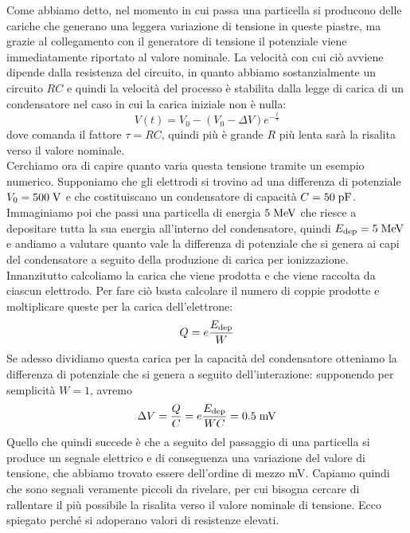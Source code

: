 \begin{esempio}
   Come abbiamo detto, nel momento in cui passa una particella si producono delle cariche che generano una leggera variazione di tensione in queste piastre, ma grazie al collegamento con il generatore di tensione il potenziale viene immediatamente riportato al valore nominale. La velocità con cui ciò avviene dipende dalla resistenza del circuito, in quanto abbiamo sostanzialmente un circuito $RC$ e quindi la velocità del processo è stabilita dalla legge di carica di un condensatore nel caso in cui la carica iniziale non è nulla:
   \begin{equation*}
      V(t)=V_0 - (V_0 - \Delta V) e^{-\frac{t}{\tau}}
   \end{equation*}
   dove comanda il fattore $\tau=RC$, quindi più è grande $R$ più lenta sarà la risalita verso il valore nominale.\\
   Cerchiamo ora di capire quanto varia questa tensione tramite un esempio numerico. Supponiamo che gli elettrodi si trovino ad una differenza di potenziale $V_0=500 \; \rm V$ e che costituiscano un condensatore di capacità $C=50 \; \rm pF$. Immaginiamo poi che passi una particella di energia $5 \; \rm MeV$ che riesce a depositare tutta la sua energia all'interno del condensatore, quindi $E_{\rm dep}=5 \; \rm MeV$ e andiamo a valutare quanto vale la differenza di potenziale che si genera ai capi del condensatore a seguito della produzione di carica per ionizzazione.\\
   Innanzitutto calcoliamo la carica che viene prodotta e che viene raccolta da ciascun elettrodo. Per fare ciò basta calcolare il numero di coppie prodotte e moltiplicare queste per la carica dell'elettrone:
   \begin{equation*}
      Q=e\frac{E_{\rm dep}}{W}
   \end{equation*}
   Se adesso dividiamo questa carica per la capacità del condensatore otteniamo la differenza di potenziale che si genera a seguito dell'interazione: supponendo per semplicità $W=1$, avremo
   \begin{equation*}
      \Delta V
      =\frac{Q}{C}
      =e\frac{E_{\rm dep}}{WC}
      =0.5 \; \rm mV
   \end{equation*}
   Quello che quindi succede è che a seguito del passaggio di una particella si produce un segnale elettrico e di conseguenza una variazione del valore di tensione, che abbiamo trovato essere dell'ordine di mezzo mV. Capiamo quindi che sono segnali veramente piccoli da rivelare, per cui bisogna cercare di rallentare il più possibile la risalita verso il valore nominale di tensione. Ecco spiegato perché si adoperano valori di resistenze elevati.
\end{esempio}

